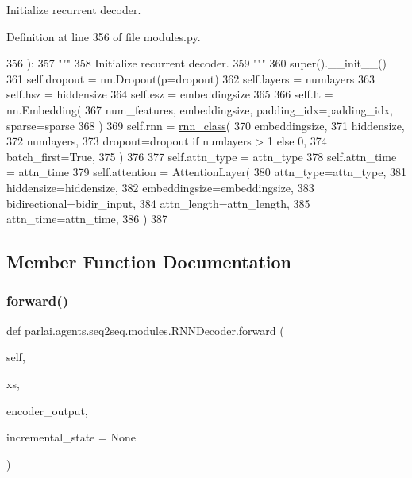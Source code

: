 \begin{DoxyVerb}Initialize recurrent decoder.
\end{DoxyVerb}
 

Definition at line 356 of file modules.\+py.


\begin{DoxyCode}
356     ):
357         \textcolor{stringliteral}{"""}
358 \textcolor{stringliteral}{        Initialize recurrent decoder.}
359 \textcolor{stringliteral}{        """}
360         super().\_\_init\_\_()
361         self.dropout = nn.Dropout(p=dropout)
362         self.layers = numlayers
363         self.hsz = hiddensize
364         self.esz = embeddingsize
365 
366         self.lt = nn.Embedding(
367             num\_features, embeddingsize, padding\_idx=padding\_idx, sparse=sparse
368         )
369         self.rnn = \hyperlink{namespaceseq2seq_1_1train_a1b062073c766f1d34a67f572ef256ba0}{rnn\_class}(
370             embeddingsize,
371             hiddensize,
372             numlayers,
373             dropout=dropout \textcolor{keywordflow}{if} numlayers > 1 \textcolor{keywordflow}{else} 0,
374             batch\_first=\textcolor{keyword}{True},
375         )
376 
377         self.attn\_type = attn\_type
378         self.attn\_time = attn\_time
379         self.attention = AttentionLayer(
380             attn\_type=attn\_type,
381             hiddensize=hiddensize,
382             embeddingsize=embeddingsize,
383             bidirectional=bidir\_input,
384             attn\_length=attn\_length,
385             attn\_time=attn\_time,
386         )
387 
\end{DoxyCode}


\subsection{Member Function Documentation}
\mbox{\label{classparlai_1_1agents_1_1seq2seq_1_1modules_1_1RNNDecoder_a883315b7f0f57ccf17c96fc8f24ddc11}} 
\subsubsection{\texorpdfstring{forward()}{forward()}}
{\footnotesize\ttfamily def parlai.\+agents.\+seq2seq.\+modules.\+R\+N\+N\+Decoder.\+forward (\begin{DoxyParamCaption}\item[{}]{self,  }\item[{}]{xs,  }\item[{}]{encoder\+\_\+output,  }\item[{}]{incremental\+\_\+state = {\ttfamily None} }\end{DoxyParamCaption})}

